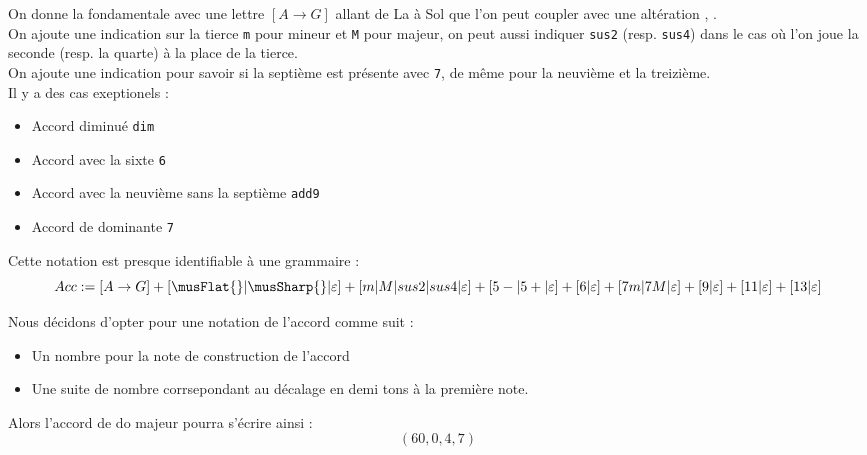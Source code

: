 \begin{defi}
  On donne la fondamentale avec une lettre $[A\rightarrow G]$ allant de La
  à Sol que l'on peut coupler avec une altération \musFlat{}, \musSharp{}.\\
  On ajoute une indication sur la tierce \texttt{m} pour mineur et \texttt{M}
  pour majeur, on peut aussi indiquer \texttt{sus2} (resp. \texttt{sus4}) dans
  le cas où l'on joue la seconde (resp. la quarte) à la place de la tierce.\\
  On ajoute une indication pour savoir si la septième est présente avec
  \texttt{7}, de même pour la neuvième et la treizième.\\
  Il y a des cas exeptionels :
  \begin{itemize}
    \item Accord diminué \texttt{dim}
    \item Accord avec la sixte \texttt{6}
    \item Accord avec la neuvième sans la septième \texttt{add9}
    \item Accord de dominante \texttt{7}
  \end{itemize}
  Cette notation est presque identifiable à une grammaire :
  $$Acc := \left[A\rightarrow
  G\right]+\left[\musFlat{}|\musSharp{}|\varepsilon\right]+\left[m|M|sus2|sus4|\varepsilon\right]+\left[5-|5+|\varepsilon\right]+\left[6|\varepsilon\right]+\left[7m|7M|\varepsilon\right]+\left[9|\varepsilon\right]+\left[11|\varepsilon\right]+\left[13|\varepsilon\right]$$
\end{defi}



\begin{defi}
  Nous décidons d'opter pour une notation de l'accord comme suit :
  \begin{itemize}
    \item Un nombre pour la note de construction de l'accord
    \item Une suite de nombre corrsepondant au décalage en demi tons à la
      première note.
  \end{itemize}
  Alors l'accord de do majeur pourra s'écrire ainsi :
  $$(60, 0, 4, 7)$$
\end{defi}

